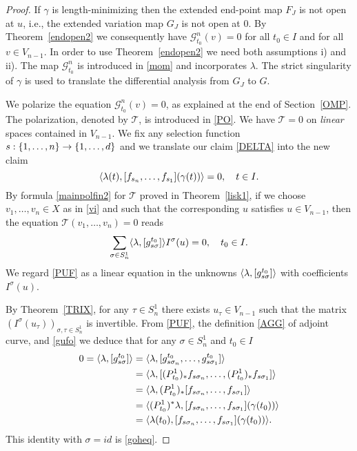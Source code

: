 \documentclass[12pt, reqno]{amsart}
\theoremstyle{plain}
\theoremstyle{definition}
\theoremstyle{remark}
\numberwithin{equation}{section}
\newcommand{\T}{\mathcal{T}}
\newcommand{\s}{\sigma}
\newcommand{\0}{\theta}
\newcommand{\g}{\gamma}
\newcommand{\la}{\lambda}
\newcommand{\1}{{-1}}
\renewcommand{\=}{\coloneqq}
\renewcommand{\.}{\dots}
\newcommand{\mc}{\mathcal}
\begin{document}
\begin{proof}
 If $\gamma$ is length-minimizing then the extended end-point
map $F_J$ is not open at $u$, i.e., the extended variation map $G_J$ is not open at $0$.
By Theorem~\ref{endopen2} we consequently have $\mc{G}_{t_0}^n(v)= 0$ for all $t_0\in I $  and for all $v\in V_{n-1}$. In order to use 
Theorem~\ref{endopen2} we need both assumptions i) and ii).
The map $\mc{G}_{t_0}^n$ is introduced in \eqref{mom} and incorporates $\lambda$.
The strict singularity of $\gamma$ is used to translate the differential analysis from $G_J$ to $G$.



We  polarize the equation $\mc{G}_{t_0}^n(v)= 0$, as explained at the end of  Section~\ref{OMP}.
The polarization, denoted by $\T$, is introduced in \eqref{PO}. We   have $\T=0$ on \emph{linear} spaces contained in $V_{n-1}$.
We fix any selection function $s:\{1,\dots,n\}\to \{1,\dots,d\}$ and we translate our claim \eqref{DELTA} into the new claim 
 \begin{equation}
  \label{goheq}
  \langle \la(t),[f_{\j_n},\.,f_{\j_1}](\g(t)) \rangle=0,\quad t\in  I .
 \end{equation} 
By   formula \eqref{mainpolfin2} for $\T$ proved in Theorem~\ref{lisk1},  if we choose $v_1,\dots,v_n \in X$ as in \eqref{vi} and such that the corresponding $u$ satisfies  $u\in V_{n-1}$, then
the equation $\T(v_1,\dots,v_n)=0$ reads
\begin{equation}
\label{PUF}
 \sum_{\s\in S_n^1} 
 \langle \lambda, [g^{t_0}_{\j\s } ]\rangle  I^{\sigma}(u) =0,\quad t_0\in I .
\end{equation}
We regard \eqref{PUF} as a linear equation in the unknowns  $\langle \lambda, [g^{t_0}_{\j\s } ]\rangle$ with coefficients 
$I^{\sigma}(u)$. 


By Theorem~\ref{TRIX}, for any $\tau \in S_n^1$ there exists $u_\tau \in V_{n-1}$ such that the matrix $( I^{\sigma}(u_\tau))_{\s,\tau\in S_n^1}$
is invertible. From \eqref{PUF}, the definition \eqref{AGG}
of adjoint curve, and  \eqref{gufo} we deduce that for any $\s\in S_n^1$ and  $ t_0\in I $  
\begin{equation}
\label{PIF} 
\begin{split}
 0 = \langle \lambda, [g^{t_0}_{\j\s } ]\rangle    
 & =\langle \lambda, [g^{t_0}_{\j\s_ n },\dots,  g^{t_0}_{\j\s _1 }]\rangle  
 \\
 &=\langle \lambda, [(P^1_{t_0}  )_* f_{\j\s_ n } ,\dots,  (P^1_{t_0} )_*f_{\j\s _1 } ]\rangle  
\\
 &=\langle \lambda,(P^1_{t_0} )_* [f_{\j\s_ n },\dots,  f_{\j\s _1 }]\rangle  
 \\
 &
 =\langle (P^1_{t_0} )^*\lambda , [f_{\j\s _n },\dots,  f_{\j\s _1 }](\gamma(t_0)) \rangle 
 \\
 &
 =\langle  \lambda(t_0) , [f_{\j\s _n },\dots,  f_{\j\s _1 }](\gamma(t_0)) \rangle.
 \end{split}
\end{equation}
This identity with $\s=id$ is   \eqref{goheq}.


\end{proof}
\end{document}
